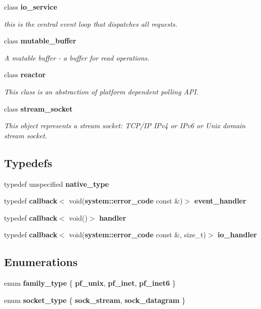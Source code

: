 \begin{DoxyCompactItemize}
class {\bf io\+\_\+service}
\begin{DoxyCompactList}\small\item\em this is the central event loop that dispatches all requests. \end{DoxyCompactList}\item 
class {\bf mutable\+\_\+buffer}
\begin{DoxyCompactList}\small\item\em A mutable buffer -\/ a buffer for read operations. \end{DoxyCompactList}\item 
class {\bf reactor}
\begin{DoxyCompactList}\small\item\em This class is an abstraction of platform dependent polling A\+PI. \end{DoxyCompactList}\item 
class {\bf stream\+\_\+socket}
\begin{DoxyCompactList}\small\item\em This object represents a stream socket\+: T\+C\+P/\+IP I\+Pv4 or I\+Pv6 or Unix domain stream socket. \end{DoxyCompactList}\end{DoxyCompactItemize}
\subsection*{Typedefs}
\begin{DoxyCompactItemize}
\item 
typedef unspecified {\bf native\+\_\+type}
\item 
typedef {\bf callback}$<$ void({\bf system\+::error\+\_\+code} const \&)$>$ {\bf event\+\_\+handler}
\item 
typedef {\bf callback}$<$ void()$>$ {\bf handler}
\item 
typedef {\bf callback}$<$ void({\bf system\+::error\+\_\+code} const \&, size\+\_\+t)$>$ {\bf io\+\_\+handler}
\end{DoxyCompactItemize}
\subsection*{Enumerations}
\begin{DoxyCompactItemize}
\item 
enum {\bf family\+\_\+type} \{ {\bfseries pf\+\_\+unix}, 
{\bfseries pf\+\_\+inet}, 
{\bfseries pf\+\_\+inet6}
 \}
\item 
enum {\bf socket\+\_\+type} \{ {\bfseries sock\+\_\+stream}, 
{\bfseries sock\+\_\+datagram}
 \}
\end{DoxyCompactItemize}
